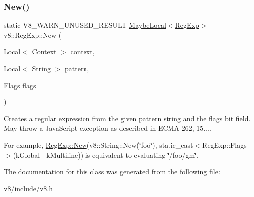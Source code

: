 \subsubsection{\texorpdfstring{New()}{New()}}
{\footnotesize\ttfamily static V8\+\_\+\+W\+A\+R\+N\+\_\+\+U\+N\+U\+S\+E\+D\+\_\+\+R\+E\+S\+U\+LT \mbox{\hyperlink{classv8_1_1MaybeLocal}{Maybe\+Local}}$<$\mbox{\hyperlink{classv8_1_1RegExp}{Reg\+Exp}}$>$ v8\+::\+Reg\+Exp\+::\+New (\begin{DoxyParamCaption}\item[{\mbox{\hyperlink{classv8_1_1Local}{Local}}$<$ Context $>$}]{context,  }\item[{\mbox{\hyperlink{classv8_1_1Local}{Local}}$<$ \mbox{\hyperlink{classv8_1_1String}{String}} $>$}]{pattern,  }\item[{\mbox{\hyperlink{classv8_1_1RegExp_aa4718a5c1f18472aff3bf51ed694fc5a}{Flags}}}]{flags }\end{DoxyParamCaption})\hspace{0.3cm}{\ttfamily [static]}}

Creates a regular expression from the given pattern string and the flags bit field. May throw a Java\+Script exception as described in E\+C\+M\+A-\/262, 15....

For example, \mbox{\hyperlink{classv8_1_1RegExp_a805f632fe98d58160773a4ba1e424b15}{Reg\+Exp\+::\+New}}(v8\+::\+String\+::\+New(\char`\"{}foo\char`\"{}), static\+\_\+cast$<$\+Reg\+Exp\+::\+Flags$>$(k\+Global $\vert$ k\+Multiline)) is equivalent to evaluating \char`\"{}/foo/gm\char`\"{}. 

The documentation for this class was generated from the following file\+:\begin{DoxyCompactItemize}
\item 
v8/include/v8.\+h\end{DoxyCompactItemize}
